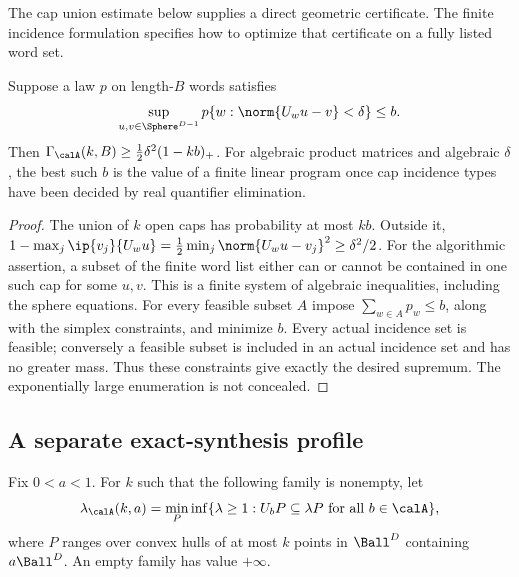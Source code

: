 The cap union estimate below supplies a direct geometric certificate. The finite incidence formulation specifies how to optimize that certificate on a fully listed word set.

\begin{proposition}\label{prop:caps}
Suppose a law $p$ on length-$B$ words satisfies
\[
 \sup_{u,v\in\Sphere^{D-1}}p\{w:\norm{U_wu-v}<\delta\}\le b.
\]
Then $\Gamma_{\calA}(k,B)\ge\tfrac12\delta^2(1-kb)_+$. For algebraic product matrices and algebraic $\delta$, the best such $b$ is the value of a finite linear program once cap incidence types have been decided by real quantifier elimination.
\end{proposition}
\begin{proof}
The union of $k$ open caps has probability at most $kb$. Outside it,
$1-\max_j\ip{v_j}{U_wu}=\tfrac12\min_j\norm{U_wu-v_j}^2\ge\delta^2/2$.
For the algorithmic assertion, a subset of the finite word list either can or cannot be contained in one such cap for some $u,v$. This is a finite system of algebraic inequalities, including the sphere equations. For every feasible subset $A$ impose $\sum_{w\in A}p_w\le b$, along with the simplex constraints, and minimize $b$. Every actual incidence set is feasible; conversely a feasible subset is included in an actual incidence set and has no greater mass. Thus these constraints give exactly the desired supremum. The exponentially large enumeration is not concealed.
\end{proof}

\subsection{A separate exact-synthesis profile}
Fix $0<a<1$. For $k$ such that the following family is nonempty, let
\begin{equation}\label{eq:enclosure-profile}
 \lambda_{\calA}(k,a)=\min_P\inf\{\lambda\ge1:
                  U_bP\subseteq\lambda P\ \text{for all }b\in\calA\},
\end{equation}
where $P$ ranges over convex hulls of at most $k$ points in $\Ball^D$ containing $a\Ball^D$. An empty family has value $+\infty$.

